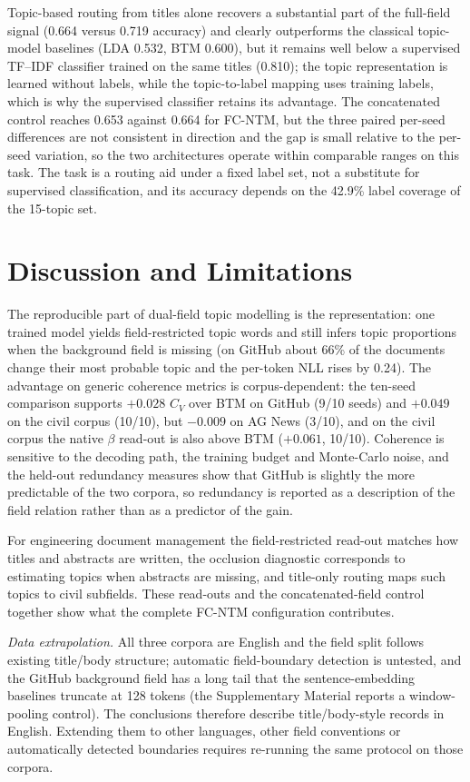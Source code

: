 \documentclass{article}
\begin{document}
Topic-based routing from titles alone recovers a substantial part of the full-field signal
(0.664 versus 0.719 accuracy) and clearly outperforms the classical topic-model baselines
(LDA 0.532, BTM 0.600), but it remains well below a supervised TF--IDF classifier trained on the
same titles (0.810); the topic representation is learned without labels, while the topic-to-label
mapping uses training labels, which is why the supervised classifier retains its advantage. The
concatenated control reaches 0.653 against 0.664 for FC-NTM, but the three paired per-seed
differences are not consistent in direction and the gap is small relative to the per-seed
variation, so the two architectures operate within comparable ranges on this task. The task
is a routing aid under a fixed label set, not a substitute for supervised classification, and
its accuracy depends on the 42.9\% label coverage of the 15-topic set.

\section{Discussion and Limitations}

The reproducible part of dual-field topic modelling is the representation: one trained model
yields field-restricted topic words and still infers topic proportions when the background field is
missing (on GitHub about 66\% of the documents change their most probable topic and the per-token
NLL rises by 0.24). The advantage on generic coherence metrics is corpus-dependent: the ten-seed
comparison supports $+0.028$ $C_V$ over BTM on GitHub (9/10 seeds) and $+0.049$ on the civil corpus
(10/10), but $-0.009$ on AG News (3/10), and on the civil corpus the native $\beta$ read-out is also
above BTM ($+0.061$, 10/10). Coherence is sensitive to the decoding path, the training budget and
Monte-Carlo noise, and the held-out redundancy measures show that GitHub is slightly the more
predictable of the two corpora, so redundancy is reported as a description of the field relation
rather than as a predictor of the gain.

For engineering document management the field-restricted read-out matches how titles and
abstracts are written, the occlusion diagnostic corresponds to estimating topics when abstracts are
missing, and title-only routing maps such topics to civil subfields. These read-outs and the
concatenated-field control together show what the complete FC-NTM configuration contributes.

\emph{Data extrapolation.} All three corpora are English and the field split follows existing
title/body structure; automatic field-boundary detection is untested, and the GitHub background field
has a long tail that the sentence-embedding baselines truncate at 128 tokens (the Supplementary Material
reports a window-pooling control). The conclusions therefore describe title/body-style records in
English. Extending them to other languages, other field conventions or automatically detected
boundaries requires re-running the same protocol on those corpora.
\end{document}
